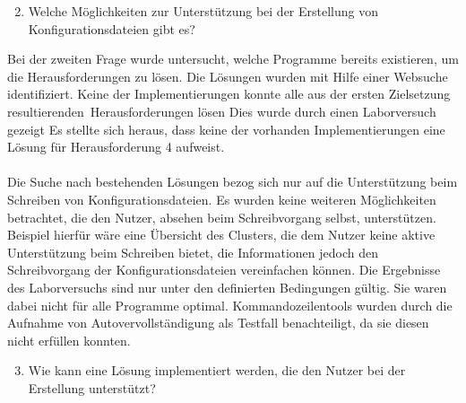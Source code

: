 \begin{enumerate}
    \setcounter{enumi}{1}
    \item Welche Möglichkeiten zur Unterstützung bei der Erstellung von Konfigurationsdateien gibt es?
\end{enumerate}

Bei der zweiten Frage wurde untersucht, welche Programme bereits existieren, um die Herausforderungen zu lösen.
Die Lösungen wurden mit Hilfe einer Websuche identifiziert.
Keine der Implementierungen konnte alle aus der ersten Zielsetzung resultierenden\ Herausforderungen lösen
Dies wurde durch einen Laborversuch gezeigt
Es stellte sich heraus, dass keine der vorhanden Implementierungen eine Lösung für Herausforderung 4 aufweist.
\\\\
Die Suche nach bestehenden Lösungen bezog sich nur auf die Unterstützung beim Schreiben von Konfigurationsdateien.
Es wurden keine weiteren Möglichkeiten betrachtet, die den Nutzer, absehen beim Schreibvorgang selbst, unterstützen.
Beispiel hierfür wäre eine Übersicht des Clusters, die dem Nutzer keine aktive Unterstützung beim Schreiben bietet,
die Informationen jedoch den Schreibvorgang der Konfigurationsdateien vereinfachen können.
Die Ergebnisse des Laborversuchs sind nur unter den definierten Bedingungen gültig.
Sie waren dabei nicht für alle Programme optimal. Kommandozeilentools wurden durch die Aufnahme von Autovervollständigung als Testfall benachteiligt,
da sie diesen nicht erfüllen konnten.

\begin{enumerate}
    \setcounter{enumi}{2}
    \item Wie kann eine Lösung implementiert werden, die den Nutzer bei der Erstellung unterstützt?
\end{enumerate}

